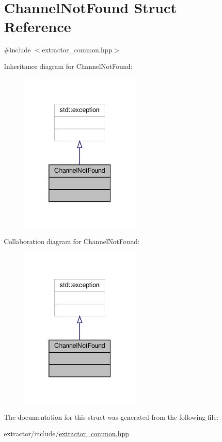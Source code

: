 \hypertarget{structChannelNotFound}{}\section{Channel\+Not\+Found Struct Reference}
\label{structChannelNotFound}


{\ttfamily \#include $<$extractor\+\_\+common.\+hpp$>$}



Inheritance diagram for Channel\+Not\+Found\+:\nopagebreak
\begin{figure}[H]
\begin{center}
\leavevmode
\includegraphics[width=175pt]{structChannelNotFound__inherit__graph}
\end{center}
\end{figure}


Collaboration diagram for Channel\+Not\+Found\+:\nopagebreak
\begin{figure}[H]
\begin{center}
\leavevmode
\includegraphics[width=175pt]{structChannelNotFound__coll__graph}
\end{center}
\end{figure}


The documentation for this struct was generated from the following file\+:\begin{DoxyCompactItemize}
\item 
extractor/include/\hyperlink{extractor__common_8hpp}{extractor\+\_\+common.\+hpp}\end{DoxyCompactItemize}
